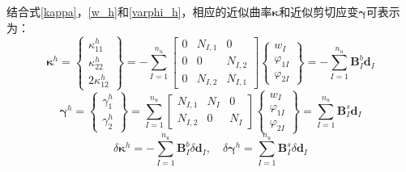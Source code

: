 结合式\eqref{kappa}，\eqref{w_h}和\eqref{varphi_h}，相应的近似曲率$\boldsymbol\kappa$和近似剪切应变$\boldsymbol\gamma$可表示为：
\begin{equation}
    \boldsymbol\kappa^h = 
    \begin{Bmatrix}
        \kappa^h_{11} \\ \kappa^h_{22} \\ 2\kappa^h_{12} 
    \end{Bmatrix} = -\sum_{I=1}^{n_u}
    \begin{bmatrix}
        0 & N_{I,1} & 0 \\ 0 & 0 & N_{I,2} \\ 0 & N_{I,2} & N_{I,1}
    \end{bmatrix}
    \begin{Bmatrix}
        w_I \\ \varphi_{1I} \\ \varphi_{2I}
    \end{Bmatrix} = - \sum_{I=1}^{n_u} \boldsymbol B^b_I \boldsymbol d_I
\end{equation}
\begin{equation}
    \boldsymbol\gamma^h = 
    \begin{Bmatrix}
        \gamma^h_1 \\ \gamma^h_2
    \end{Bmatrix} = \sum_{I=1}^{n_u}
    \begin{bmatrix}
        N_{I,1} & N_I & 0 \\
        N_{I,2} & 0 & N_I
    \end{bmatrix}
    \begin{Bmatrix}
        w_I \\ \varphi_{1I} \\ \varphi_{2I}
    \end{Bmatrix} = \sum_{I=1}^{n_u} \boldsymbol B^s_I \boldsymbol d_I
\end{equation}
\begin{equation}\label{kappa_h}
    \delta\boldsymbol\kappa^h = - \sum_{I=1}^{n_u} \boldsymbol B^b_I \delta\boldsymbol d_I ,\quad \delta\boldsymbol\gamma^h = \sum_{I=1}^{n_u} \boldsymbol B^s_I \delta\boldsymbol d_I
\end{equation}

